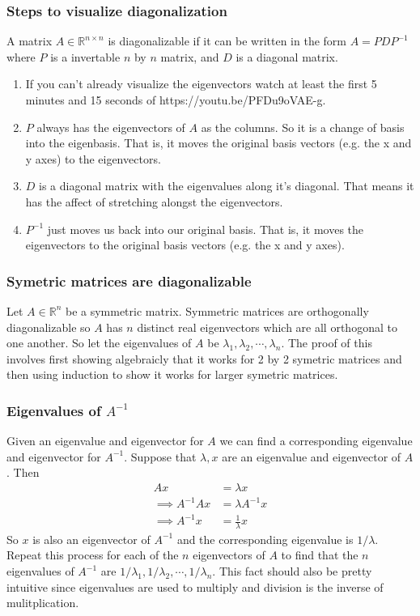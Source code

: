 \documentclass{beamer}
\theoremstyle{definition}
\renewcommand{\=}{&=&}
\newcommand{\<}{\langle}
\renewcommand{\>}{\rangle}
\begin{document}
\begin{frame}[t]
  \frametitle{Steps to visualize diagonalization}
  A matrix $A \in \mathbb{R}^{n\times n}$ is diagonalizable if it can be written in the form $A = PDP^{-1}$
  where $P$ is a invertable $n$ by $n$ matrix, and $D$ is a diagonal matrix.
  \begin{enumerate}
  \item If you can't already visualize the eigenvectors watch at least the first
    5 minutes and 15 seconds of https://youtu.be/PFDu9oVAE-g.
  \item $P$ always has the eigenvectors of $A$ as the columns. So it is a change of basis into the eigenbasis. That is, it moves the
    original basis vectors (e.g. the x and y axes) to the eigenvectors.
  \item $D$ is a diagonal matrix with the eigenvalues along it's diagonal. That
    means it has the affect of stretching alongst the eigenvectors.
  \item $P^{-1}$ just moves us back into our original basis. That is, it moves
    the eigenvectors to the original basis vectors (e.g. the x and y axes).
  \end{enumerate}
\end{frame}
\begin{frame}[t]
\frametitle{Symetric matrices are diagonalizable}
Let $A \in \mathbb{R}^n$ be a symmetric matrix.
Symmetric matrices are orthogonally diagonalizable so $A$ has $n$ distinct real
eigenvectors which are all orthogonal to one another.
So let the eigenvalues of $A$ be $\lambda_1, \lambda_2, \cdots, \lambda_n$. The proof of this involves
first showing algebraicly that it works for 2 by 2 symetric matrices and then using
induction to show it works for larger symetric matrices. \\
\end{frame}
\begin{frame}[t]
\frametitle{Eigenvalues of $A^{-1}$}
Given an eigenvalue and eigenvector for $A$ we can find a corresponding
eigenvalue and eigenvector for $A^{-1}$. Suppose that $\lambda, x$ are an eigenvalue
and eigenvector of $A$. Then 
\begin{align*}
  Ax &= \lambda x \\
  \implies A^{-1}A x &= \lambda A^{-1} x \\
  \implies A^{-1} x &= \frac{1}{\lambda} x
\end{align*}
So $x$ is also an eigenvector of $A^{-1}$ and the corresponding eigenvalue is $1/\lambda$.
Repeat this process for each of the $n$ eigenvectors of $A$ to find that the $n$
eigenvalues of $A^{-1}$ are $1/\lambda_1, 1/\lambda_2, \cdots, 1/\lambda_n$.
This fact should also be pretty intuitive since eigenvalues are used to multiply
and division is the inverse of mulitplication.
\end{frame}
\end{document}
